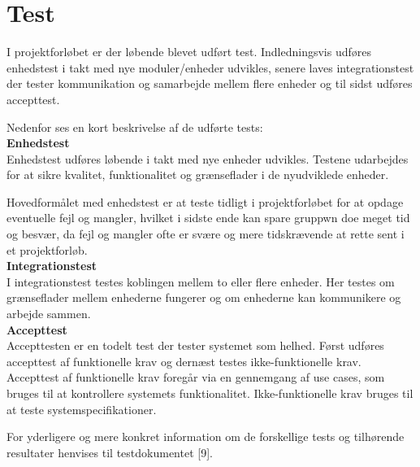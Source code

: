 \section{Test}

\label{chap:test}

I projektforløbet er der løbende blevet udført test. Indledningsvis udføres enhedstest i takt med nye moduler/enheder udvikles, senere laves integrationstest der tester kommunikation og samarbejde mellem flere enheder og til sidst udføres accepttest.

Nedenfor ses en kort beskrivelse af de udførte tests:\\


\textbf{Enhedstest} \\
Enhedstest udføres løbende i takt med nye enheder udvikles. Testene udarbejdes for at sikre kvalitet, funktionalitet og grænseflader i de nyudviklede enheder. 

Hovedformålet med enhedstest er at teste tidligt i projektforløbet for at opdage eventuelle fejl og mangler, hvilket i sidste ende kan spare gruppwn doe meget tid og besvær, da fejl og mangler ofte er svære og mere tidskrævende at rette sent i et projektforløb.\\


\textbf{Integrationstest} \\
I integrationstest testes koblingen mellem to eller flere enheder. Her testes om grænseflader mellem enhederne fungerer og om enhederne kan kommunikere og arbejde sammen.  \\



\textbf{Accepttest} \\
Accepttesten er en todelt test der tester systemet som helhed. 
Først udføres accepttest af funktionelle krav og dernæst testes ikke-funktionelle krav.
Accepttest af funktionelle krav foregår via en gennemgang af use cases, som bruges til at kontrollere systemets funktionalitet. Ikke-funktionelle krav bruges til at teste systemspecifikationer.  

For yderligere og mere konkret information om de forskellige tests og tilhørende resultater henvises til testdokumentet [9].
